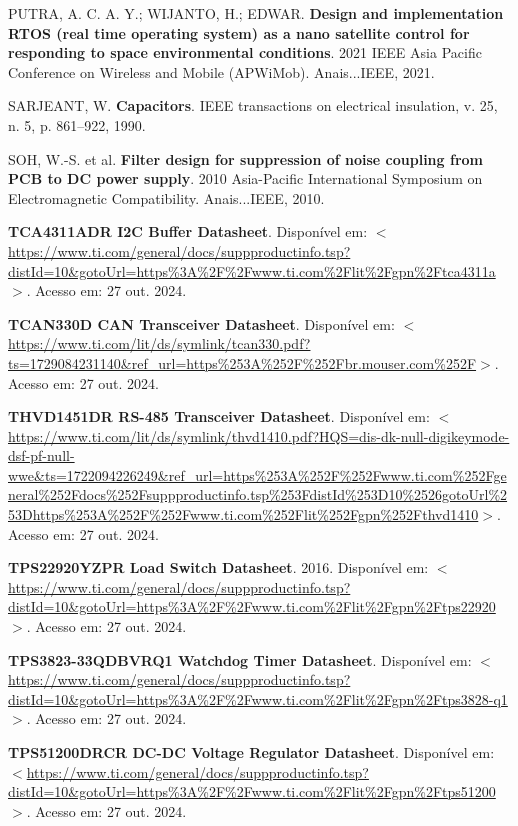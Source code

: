 \begin{flushleft}
\begin{thebibliography}{00}
 PUTRA, A. C. A. Y.; WIJANTO, H.; EDWAR. \textbf{Design and implementation RTOS (real time operating system) as a nano satellite control for responding to space environmental conditions}. 2021 IEEE Asia Pacific Conference on Wireless and Mobile (APWiMob). Anais...IEEE, 2021.

 SARJEANT, W. \textbf{Capacitors}. IEEE transactions on electrical insulation, v. 25, n. 5, p. 861–922, 1990.

 SOH, W.-S. et al. \textbf{Filter design for suppression of noise coupling from PCB to DC power supply}. 2010 Asia-Pacific International Symposium on Electromagnetic Compatibility. Anais...IEEE, 2010.

 \textbf{TCA4311ADR I2C Buffer Datasheet}. Disponível em: $<$\url{https://www.ti.com/general/docs/suppproductinfo.tsp?distId=10\&gotoUrl=https\%3A\%2F\%2Fwww.ti.com\%2Flit\%2Fgpn\%2Ftca4311a}$>$. Acesso em: 27 out. 2024. 

 \textbf{TCAN330D CAN Transceiver Datasheet}. Disponível em: $<$\url{https://www.ti.com/lit/ds/symlink/tcan330.pdf?ts=1729084231140\&ref\_url=https\%253A\%252F\%252Fbr.mouser.com\%252F}$>$. Acesso em: 27 out. 2024. 

 \textbf{THVD1451DR RS-485 Transceiver Datasheet}. Disponível em: $<$\url{https://www.ti.com/lit/ds/symlink/thvd1410.pdf?HQS=dis-dk-null-digikeymode-dsf-pf-null-wwe\&ts=1722094226249\&ref\_url=https\%253A\%252F\%252Fwww.ti.com\%252Fgeneral\%252Fdocs\%252Fsuppproductinfo.tsp\%253FdistId\%253D10\%2526gotoUrl\%253Dhttps\%253A\%252F\%252Fwww.ti.com\%252Flit\%252Fgpn\%252Fthvd1410}$>$. Acesso em: 27 out. 2024. 

 \textbf{TPS22920YZPR Load Switch Datasheet}. 2016. Disponível em: $<$\url{https://www.ti.com/general/docs/suppproductinfo.tsp?distId=10\&gotoUrl=https\%3A\%2F\%2Fwww.ti.com\%2Flit\%2Fgpn\%2Ftps22920}$>$. Acesso em: 27 out. 2024. 

 \textbf{TPS3823-33QDBVRQ1 Watchdog Timer Datasheet}. Disponível em: $<$\url{https://www.ti.com/general/docs/suppproductinfo.tsp?distId=10\&gotoUrl=https\%3A\%2F\%2Fwww.ti.com\%2Flit\%2Fgpn\%2Ftps3828-q1}$>$. Acesso em: 27 out. 2024. 

 \textbf{TPS51200DRCR DC-DC Voltage Regulator Datasheet}. Disponível em: $<$\url{https://www.ti.com/general/docs/suppproductinfo.tsp?distId=10\&gotoUrl=https\%3A\%2F\%2Fwww.ti.com\%2Flit\%2Fgpn\%2Ftps51200}$>$. Acesso em: 27 out. 2024. 


\end{thebibliography}
\end{flushleft}
